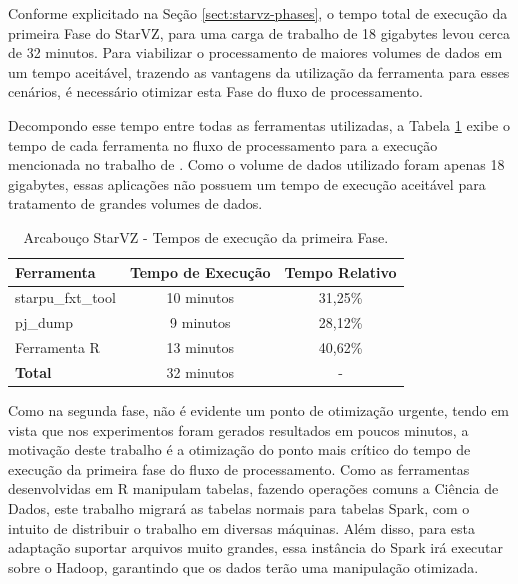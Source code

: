 Conforme explicitado na Seção \ref{sect:starvz-phases}, o tempo total de 
execução da primeira Fase do StarVZ, para uma carga de trabalho de 18 gigabytes 
levou cerca de 32 minutos. Para viabilizar o processamento de maiores volumes de 
dados em um tempo aceitável, trazendo as vantagens da utilização da ferramenta 
para esses cenários, é necessário otimizar esta Fase do fluxo de processamento.

Decompondo esse tempo entre todas as ferramentas utilizadas, a Tabela 
\ref{tab:exectimes} exibe o tempo de cada ferramenta no fluxo de processamento 
para a execução mencionada no trabalho de \citet{ref:starvz}. Como o volume de 
dados utilizado foram apenas 18 gigabytes, essas aplicações não possuem um tempo 
de execução aceitável para tratamento
de grandes volumes de dados.

\begin{table}[H]
\centering
\begin{tabular}{l c c} \toprule
\textbf{Ferramenta}  &  \textbf{Tempo de Execução}  & \textbf{Tempo Relativo}\\ \midrule
starpu\_fxt\_tool     & 10 minutos   & 31,25\%  \\
pj\_dump            & 9 minutos    & 28,12\%     \\
Ferramenta R        & 13 minutos   & 40,62\%      \\
\textbf{Total}     & 32 minutos & -
\end{tabular}
\caption{Arcabouço StarVZ - Tempos de execução da primeira Fase.}
\label{tab:exectimes}
\end{table}

Como na segunda fase, não é evidente um ponto de otimização urgente, tendo em 
vista que nos experimentos foram gerados resultados em poucos minutos, a 
motivação deste trabalho é a otimização do ponto mais crítico do tempo de 
execução da primeira fase do fluxo de processamento. Como as ferramentas 
desenvolvidas em R manipulam tabelas, fazendo operações comuns a Ciência de 
Dados, este trabalho migrará as tabelas normais para tabelas Spark, com o 
intuito de distribuir o trabalho em diversas máquinas. Além disso, para esta 
adaptação suportar arquivos muito grandes, essa instância do Spark irá
executar sobre o Hadoop, garantindo que os dados terão uma manipulação 
otimizada.